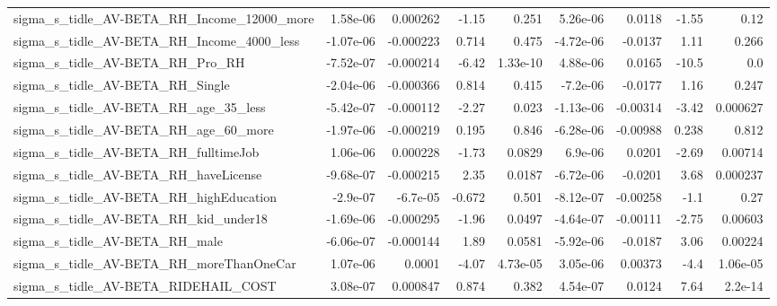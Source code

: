 \begin{tabular}{lrrrrrrrr}
sigma\_s\_tidle\_AV-BETA\_RH\_Income\_12000\_more         &    1.58e-06 &     0.000262 &     -1.15 &    0.251 &   5.26e-06 &      0.0118 &        -1.55 &          0.12 \\
sigma\_s\_tidle\_AV-BETA\_RH\_Income\_4000\_less          &   -1.07e-06 &    -0.000223 &     0.714 &    0.475 &  -4.72e-06 &     -0.0137 &         1.11 &         0.266 \\
sigma\_s\_tidle\_AV-BETA\_RH\_Pro\_RH                    &   -7.52e-07 &    -0.000214 &     -6.42 & 1.33e-10 &   4.88e-06 &      0.0165 &        -10.5 &           0.0 \\
sigma\_s\_tidle\_AV-BETA\_RH\_Single                    &   -2.04e-06 &    -0.000366 &     0.814 &    0.415 &   -7.2e-06 &     -0.0177 &         1.16 &         0.247 \\
sigma\_s\_tidle\_AV-BETA\_RH\_age\_35\_less               &   -5.42e-07 &    -0.000112 &     -2.27 &    0.023 &  -1.13e-06 &    -0.00314 &        -3.42 &      0.000627 \\
sigma\_s\_tidle\_AV-BETA\_RH\_age\_60\_more               &   -1.97e-06 &    -0.000219 &     0.195 &    0.846 &  -6.28e-06 &    -0.00988 &        0.238 &         0.812 \\
sigma\_s\_tidle\_AV-BETA\_RH\_fulltimeJob               &    1.06e-06 &     0.000228 &     -1.73 &   0.0829 &    6.9e-06 &      0.0201 &        -2.69 &       0.00714 \\
sigma\_s\_tidle\_AV-BETA\_RH\_haveLicense               &   -9.68e-07 &    -0.000215 &      2.35 &   0.0187 &  -6.72e-06 &     -0.0201 &         3.68 &      0.000237 \\
sigma\_s\_tidle\_AV-BETA\_RH\_highEducation             &    -2.9e-07 &     -6.7e-05 &    -0.672 &    0.501 &  -8.12e-07 &    -0.00258 &         -1.1 &          0.27 \\
sigma\_s\_tidle\_AV-BETA\_RH\_kid\_under18               &   -1.69e-06 &    -0.000295 &     -1.96 &   0.0497 &  -4.64e-07 &    -0.00111 &        -2.75 &       0.00603 \\
sigma\_s\_tidle\_AV-BETA\_RH\_male                      &   -6.06e-07 &    -0.000144 &      1.89 &   0.0581 &  -5.92e-06 &     -0.0187 &         3.06 &       0.00224 \\
sigma\_s\_tidle\_AV-BETA\_RH\_moreThanOneCar            &    1.07e-06 &       0.0001 &     -4.07 & 4.73e-05 &   3.05e-06 &     0.00373 &         -4.4 &      1.06e-05 \\
sigma\_s\_tidle\_AV-BETA\_RIDEHAIL\_COST                &    3.08e-07 &     0.000847 &     0.874 &    0.382 &   4.54e-07 &      0.0124 &         7.64 &       2.2e-14 \\

\end{tabular}
